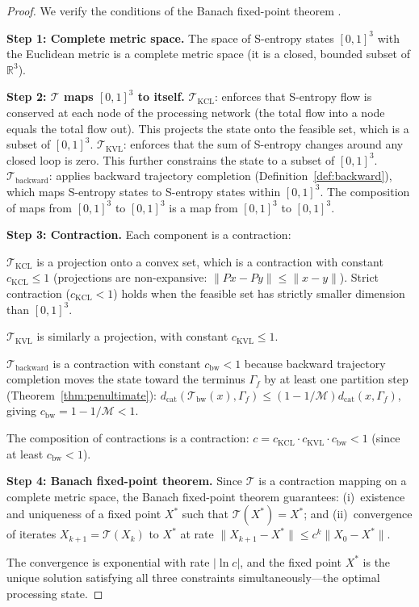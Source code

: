 \documentclass[twocolumn,10pt]{article}
\theoremstyle{remark}
\newcommand{\Depth}{\mathcal{M}}
\begin{document}
\begin{proof}
We verify the conditions of the Banach fixed-point theorem \cite{banach1922}.

\textbf{Step 1: Complete metric space.}
The space of S-entropy states $[0,1]^3$ with the Euclidean metric is a complete metric space (it is a closed, bounded subset of $\mathbb{R}^3$).

\textbf{Step 2: $\mathcal{T}$ maps $[0,1]^3$ to itself.}
$\mathcal{T}_{\mathrm{KCL}}$: enforces that S-entropy flow is conserved at each node of the processing network (the total flow into a node equals the total flow out). This projects the state onto the feasible set, which is a subset of $[0,1]^3$.
$\mathcal{T}_{\mathrm{KVL}}$: enforces that the sum of S-entropy changes around any closed loop is zero. This further constrains the state to a subset of $[0,1]^3$.
$\mathcal{T}_{\mathrm{backward}}$: applies backward trajectory completion (Definition~\ref{def:backward}), which maps S-entropy states to S-entropy states within $[0,1]^3$.
The composition of maps from $[0,1]^3$ to $[0,1]^3$ is a map from $[0,1]^3$ to $[0,1]^3$.

\textbf{Step 3: Contraction.}
Each component is a contraction:

$\mathcal{T}_{\mathrm{KCL}}$ is a projection onto a convex set, which is a contraction with constant $c_{\mathrm{KCL}} \leq 1$ (projections are non-expansive: $\|Px - Py\| \leq \|x - y\|$). Strict contraction ($c_{\mathrm{KCL}} < 1$) holds when the feasible set has strictly smaller dimension than $[0,1]^3$.

$\mathcal{T}_{\mathrm{KVL}}$ is similarly a projection, with constant $c_{\mathrm{KVL}} \leq 1$.

$\mathcal{T}_{\mathrm{backward}}$ is a contraction with constant $c_{\mathrm{bw}} < 1$ because backward trajectory completion moves the state toward the terminus $\Gamma_f$ by at least one partition step (Theorem~\ref{thm:penultimate}): $d_{\mathrm{cat}}(\mathcal{T}_{\mathrm{bw}}(x), \Gamma_f) \leq (1 - 1/\Depth) d_{\mathrm{cat}}(x, \Gamma_f)$, giving $c_{\mathrm{bw}} = 1 - 1/\Depth < 1$.

The composition of contractions is a contraction: $c = c_{\mathrm{KCL}} \cdot c_{\mathrm{KVL}} \cdot c_{\mathrm{bw}} < 1$ (since at least $c_{\mathrm{bw}} < 1$).

\textbf{Step 4: Banach fixed-point theorem.}
Since $\mathcal{T}$ is a contraction mapping on a complete metric space, the Banach fixed-point theorem \cite{banach1922} guarantees: (i)~existence and uniqueness of a fixed point $X^*$ such that $\mathcal{T}(X^*) = X^*$; and (ii)~convergence of iterates $X_{k+1} = \mathcal{T}(X_k)$ to $X^*$ at rate $\|X_{k+1} - X^*\| \leq c^k \|X_0 - X^*\|$.

The convergence is exponential with rate $|\ln c|$, and the fixed point $X^*$ is the unique solution satisfying all three constraints simultaneously---the optimal processing state.
\end{proof}
\end{document}
